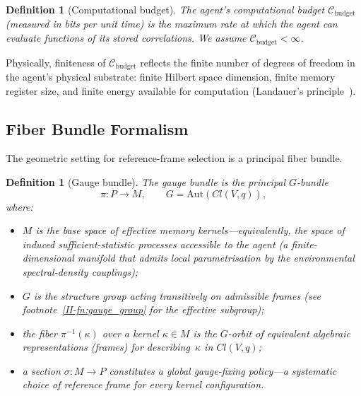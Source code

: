 \documentclass[12pt,a4paper,openany]{book}
\newtheorem{definition}[theorem]{Definition}
\begin{document}
\begin{definition}[Computational budget]
\label{II-def:budget}
The agent's \emph{computational budget}
$\mathcal{C}_{\mathrm{budget}}$ (measured in bits per unit
time) is the maximum rate at which the agent can evaluate
functions of its stored correlations.
We assume $\mathcal{C}_{\mathrm{budget}} < \infty$.
\end{definition}

Physically, finiteness of $\mathcal{C}_{\mathrm{budget}}$
reflects the finite number of degrees of freedom in the
agent's physical substrate: finite Hilbert space dimension,
finite memory register size, and finite energy available for
computation (Landauer's
principle~\cite{Landauer1961,Bennett1982}).

\subsection{Fiber Bundle Formalism}
\label{II-subsec:fiber}

The geometric setting for reference-frame selection is a
principal fiber bundle.

\begin{definition}[Gauge bundle]
\label{II-def:bundle}
The \emph{gauge bundle} is the principal $G$-bundle
\begin{equation}
\label{II-eq:bundle}
\pi: P \to M, \qquad G = \mathrm{Aut}(Cl(V,q)),
\end{equation}
where:
\begin{itemize}
\item $M$ is the base space of \emph{effective memory
  kernels}---equivalently, the space of induced
  sufficient-statistic processes accessible to the agent
  (a finite-dimensional manifold that admits local
  parametrisation by the environmental spectral-density
  couplings);
\item $G$ is the structure group acting transitively on
  admissible frames (see
  footnote~\ref{II-fn:gauge_group} for the effective
  subgroup);
\item the fiber $\pi^{-1}(\kappa)$ over a kernel
  $\kappa \in M$ is the $G$-orbit of equivalent algebraic
  representations (frames) for describing~$\kappa$
  in $Cl(V,q)$;
\item a \emph{section} $\sigma: M \to P$ constitutes a
  global gauge-fixing policy---a systematic choice
  of reference frame for every kernel configuration.
\end{itemize}
\end{definition}
\end{document}

